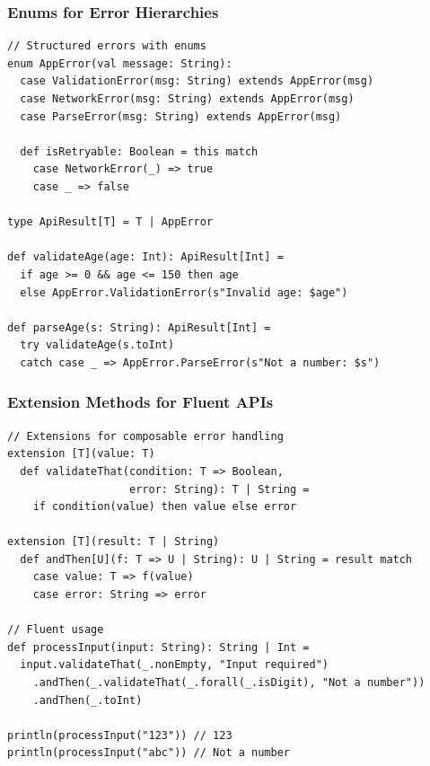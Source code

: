 \documentclass{beamer}
\begin{document}
\begin{frame}[fragile]
\frametitle{Enums for Error Hierarchies}

\begin{lstlisting}[style=scalaStyle]
// Structured errors with enums
enum AppError(val message: String):
  case ValidationError(msg: String) extends AppError(msg)
  case NetworkError(msg: String) extends AppError(msg)
  case ParseError(msg: String) extends AppError(msg)
  
  def isRetryable: Boolean = this match
    case NetworkError(_) => true
    case _ => false

type ApiResult[T] = T | AppError

def validateAge(age: Int): ApiResult[Int] =
  if age >= 0 && age <= 150 then age
  else AppError.ValidationError(s"Invalid age: $age")

def parseAge(s: String): ApiResult[Int] =
  try validateAge(s.toInt)
  catch case _ => AppError.ParseError(s"Not a number: $s")
\end{lstlisting}

\end{frame}

\begin{frame}[fragile]
\frametitle{Extension Methods for Fluent APIs}

\begin{lstlisting}[style=scalaStyle]
// Extensions for composable error handling
extension [T](value: T)
  def validateThat(condition: T => Boolean, 
                   error: String): T | String =
    if condition(value) then value else error

extension [T](result: T | String)
  def andThen[U](f: T => U | String): U | String = result match
    case value: T => f(value)
    case error: String => error

// Fluent usage
def processInput(input: String): String | Int =
  input.validateThat(_.nonEmpty, "Input required")
    .andThen(_.validateThat(_.forall(_.isDigit), "Not a number"))
    .andThen(_.toInt)

println(processInput("123")) // 123
println(processInput("abc")) // Not a number
\end{lstlisting}

\end{frame}
\end{document}
